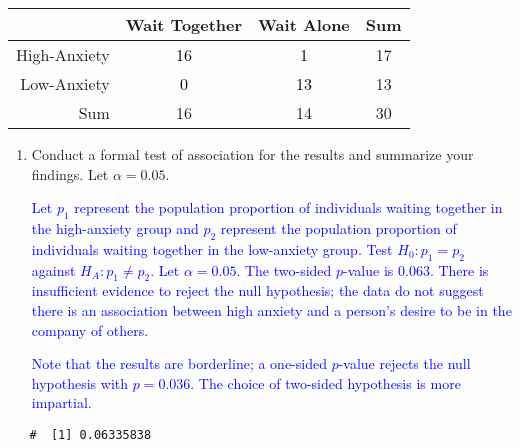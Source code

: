 \documentclass[letterpaper,12pt,twoside,]{pinp}
\begin{document}
\begin{enumerate}
\begin{enumerate}
    \begin{table}[h!]
     \centering
     \color{gray}
     \begin{tabular}{r|cc|c}
     \hline
     & Wait Together & Wait Alone & Sum \\ 
     \hline
     High-Anxiety & \textcolor{black}{16} & \textcolor{black}{1} & 17 \\ 
     Low-Anxiety & \textcolor{black}{0} & \textcolor{black}{13} & 13 \\ 
     \hline
     Sum & 16 & 14 & 30 \\ 
     \hline
     \end{tabular}
     \end{table}
  \end{enumerate}

  \newpage

  \begin{enumerate}
  \def\labelenumii{\alph{enumii})}
  \setcounter{enumii}{3}
  \item
    Conduct a formal test of association for the results and summarize
    your findings. Let \(\alpha = 0.05\).

    \textcolor{blue}{Let $p_1$ represent the population proportion of individuals waiting together in the high-anxiety group and $p_2$ represent the population proportion of individuals waiting together in the low-anxiety group. Test $H_0: p_1 = p_2$ against $H_A: p_1 \neq p_2$. Let $\alpha = 0.05$. The two-sided $p$-value is 0.063. There is insufficient evidence to reject the null hypothesis; the data do not suggest there is an association between high anxiety and a person's desire to be in the company of others.}

    \textcolor{blue}{Note that the results are borderline; a one-sided $p$-value rejects the null hypothesis with $p = 0.036$. The choice of two-sided hypothesis is more impartial.}
  \end{enumerate}

\begin{Shaded}
\begin{Highlighting}[]
\OperatorTok{$}
\end{Highlighting}
\end{Shaded}

  \begin{ShadedResult}
   \begin{verbatim}
   #  [1] 0.06335838
   \end{verbatim}
   \end{ShadedResult}


\end{enumerate}
\end{document}
